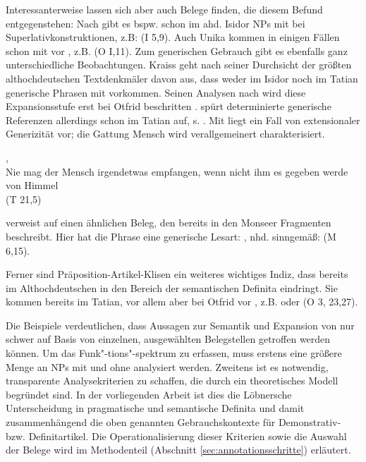 Interessanterweise lassen sich aber auch Belege finden, die diesem Befund entgegenstehen: Nach \textcite{Kraiss2012} gibt es bspw. schon im ahd. Isidor NPs mit  bei Superlativkonstruktionen, z.B:   (I 5,9). Auch Unika kommen in einigen Fällen schon mit  vor \parencite[75]{Szczepaniak2011a}, z.B.   (O I,11). Zum generischen Gebrauch gibt es ebenfalls ganz unterschiedliche Beobachtungen. Kraiss geht nach seiner Durchsicht der größten althochdeutschen Textdenkmäler davon aus, dass weder im Isidor noch im Tatian generische Phrasen mit  vorkommen. Seinen Analysen nach wird diese Expansionsstufe erst bei Otfrid beschritten \parencite[133]{Kraiss2012}. \textcite[80]{Oubouzar1992} spürt determinierte generische Referenzen allerdings schon im Tatian auf, s. . Mit  liegt ein Fall von extensionaler Generizität vor; die Gattung Mensch wird verallgemeinert charakterisiert.  

\begin{exe} 
\ex \label{ex:gen-tat-def}
	\gll {}     ,        \\
		Nie mag der Mensch irgendetwas empfangen, {wenn nicht} ihm es gegeben werde von Himmel\\
	\trans {} (T 21,5)
\end{exe}
\noindent 
\textcite{Petrova2020} verweist auf einen ähnlichen Beleg, den bereits \textcite[60]{Hodler1954} in den Monseer Fragmenten beschreibt. Hier hat die Phrase   eine  generische Lesart:  , nhd. sinngemäß:  (M 6,15). 

Ferner sind Präposition-Artikel-Klisen ein weiteres wichtiges Indiz, dass  bereits im Althochdeutschen in den Bereich der semantischen Definita eindringt. Sie kommen bereits im Tatian, vor allem aber bei Otfrid vor \parencite[vgl.][]{Nubling1992,Schlachter2015}, z.B.   oder   (O 3, 23,27). 

Die Beispiele verdeutlichen, dass Aussagen zur Semantik und Expansion von  nur schwer auf Basis von einzelnen, ausgewählten Belegstellen getroffen werden können. Um das Funk"-tions"-spektrum zu erfassen, muss erstens eine größere Menge an NPs mit und ohne  analysiert werden. Zweitens ist es notwendig, transparente Analysekriterien zu schaffen, die durch ein theoretisches Modell begründet sind. In der vorliegenden Arbeit ist dies die Löbnersche Unterscheidung in pragmatische und semantische Definita und damit zusammenhängend die oben genannten Gebrauchskontexte für Demonstrativ- bzw. Definitartikel. Die Operationalisierung dieser Kriterien sowie die Auswahl der Belege wird im Methodenteil (Abschnitt \ref{sec:annotationsschritte}) erläutert. 

